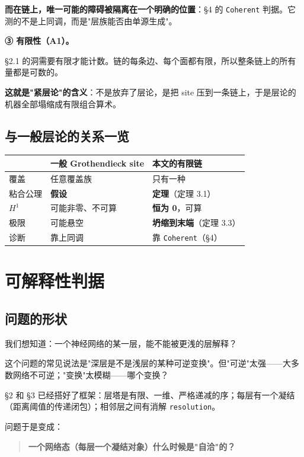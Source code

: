 \documentclass[11pt,a4paper]{ctexart}
\begin{document}
\textbf{而在链上，唯一可能的障碍被隔离在一个明确的位置}：§4 的 \texttt{Coherent} 判据。它测的不是上同调，而是"层族能否由单源生成"。

\textbf{③ 有限性（A1）。}

§2.1 的洞需要有限才能计数。链的每条边、每个面都有限，所以整条链上的所有量都是可数的。

\textbf{这就是"紧层论"的含义}：不是放弃了层论，是把 site 压到一条链上，于是层论的机器全部塌缩成有限组合算术。

\subsection{与一般层论的关系一览}

\begin{center}\small
\begin{tabular}{lll}
\toprule
 & 一般 Grothendieck site & 本文的有限链 \\
\midrule
覆盖 & 任意覆盖族 & 只有一种 \\
粘合公理 & \textbf{假设} & \textbf{定理}（定理 3.1） \\
\texttt{\ensuremath{H^{1}}} & 可能非零、不可算 & \textbf{恒为 0}，可算 \\
极限 & 可能悬空 & \textbf{坍缩到末端}（定理 3.3） \\
诊断 & 靠上同调 & 靠 \texttt{Coherent}（§4） \\
\bottomrule
\end{tabular}
\end{center}

\bigskip

\section{可解释性判据}

\subsection{问题的形状}

我们想知道：一个神经网络的某一层，能不能被更浅的层解释？

这个问题的常见说法是"深层是不是浅层的某种可逆变换"。但"可逆"太强——大多数网络不可逆；"变换"太模糊——哪个变换？

§2 和 §3 已经搭好了框架：层塔是有限、一维、严格递减的序；每层有一个凝结（距离阈值的传递闭包）；相邻层之间有消解 \texttt{resolution}。

问题于是变成：

\begin{quote}
\textbf{一个网络态（每层一个凝结对象）什么时候是"自洽"的？}
\end{quote}
\end{document}
